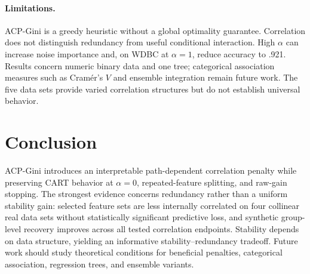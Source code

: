 \documentclass[runningheads]{llncs}
\begin{document}
\paragraph{Limitations.} ACP-Gini is a greedy heuristic without a global optimality guarantee. Correlation does not distinguish redundancy from useful conditional interaction. High $\alpha$ can increase noise importance and, on WDBC at $\alpha=1$, reduce accuracy to .921. Results concern numeric binary data and one tree; categorical association measures such as Cram{\'e}r's $V$ and ensemble integration remain future work. The five data sets provide varied correlation structures but do not establish universal behavior.

\section{Conclusion}
ACP-Gini introduces an interpretable path-dependent correlation penalty while preserving CART behavior at $\alpha=0$, repeated-feature splitting, and raw-gain stopping. The strongest evidence concerns redundancy rather than a uniform stability gain: selected feature sets are less internally correlated on four collinear real data sets without statistically significant predictive loss, and synthetic group-level recovery improves across all tested correlation endpoints. Stability depends on data structure, yielding an informative stability--redundancy tradeoff. Future work should study theoretical conditions for beneficial penalties, categorical association, regression trees, and ensemble variants.



\end{document}
